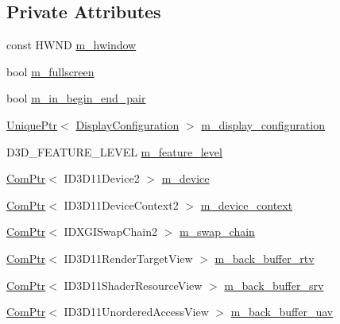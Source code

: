 \subsection*{Private Attributes}
\begin{DoxyCompactItemize}
\item 
const H\+W\+ND \hyperlink{classmage_1_1_renderer_adadc1028e5ad6551abbecfd8529e4aa1}{m\+\_\+hwindow}
\item 
bool \hyperlink{classmage_1_1_renderer_a72bb88b17491bd388460afae9d207b0a}{m\+\_\+fullscreen}
\item 
bool \hyperlink{classmage_1_1_renderer_a3caa1bad6cbfde8f87f807e5c97924e3}{m\+\_\+in\+\_\+begin\+\_\+end\+\_\+pair}
\item 
\hyperlink{namespacemage_a3316d7143a973e37adf1110f2e80ca31}{Unique\+Ptr}$<$ \hyperlink{structmage_1_1_display_configuration}{Display\+Configuration} $>$ \hyperlink{classmage_1_1_renderer_ab5638066fba5a0b9ce307f7db3ba5433}{m\+\_\+display\+\_\+configuration}
\item 
D3\+D\+\_\+\+F\+E\+A\+T\+U\+R\+E\+\_\+\+L\+E\+V\+EL \hyperlink{classmage_1_1_renderer_aa97b108ef58f7d41ddb527f6ba2bfdf9}{m\+\_\+feature\+\_\+level}
\item 
\hyperlink{namespacemage_ae74f374780900893caa5555d1031fd79}{Com\+Ptr}$<$ I\+D3\+D11\+Device2 $>$ \hyperlink{classmage_1_1_renderer_aecf4bcb70dc186b4f2083df38d1e4bc3}{m\+\_\+device}
\item 
\hyperlink{namespacemage_ae74f374780900893caa5555d1031fd79}{Com\+Ptr}$<$ I\+D3\+D11\+Device\+Context2 $>$ \hyperlink{classmage_1_1_renderer_a47c4a1d46e84bbdc3ec876809633877e}{m\+\_\+device\+\_\+context}
\item 
\hyperlink{namespacemage_ae74f374780900893caa5555d1031fd79}{Com\+Ptr}$<$ I\+D\+X\+G\+I\+Swap\+Chain2 $>$ \hyperlink{classmage_1_1_renderer_a5419a7a11e8f0f69e92dd6a5cb9bd217}{m\+\_\+swap\+\_\+chain}
\item 
\hyperlink{namespacemage_ae74f374780900893caa5555d1031fd79}{Com\+Ptr}$<$ I\+D3\+D11\+Render\+Target\+View $>$ \hyperlink{classmage_1_1_renderer_a8569a868dc96be6d831dcbe1d775f4d1}{m\+\_\+back\+\_\+buffer\+\_\+rtv}
\item 
\hyperlink{namespacemage_ae74f374780900893caa5555d1031fd79}{Com\+Ptr}$<$ I\+D3\+D11\+Shader\+Resource\+View $>$ \hyperlink{classmage_1_1_renderer_adddf1283111a3c43a7957411688136b8}{m\+\_\+back\+\_\+buffer\+\_\+srv}
\item 
\hyperlink{namespacemage_ae74f374780900893caa5555d1031fd79}{Com\+Ptr}$<$ I\+D3\+D11\+Unordered\+Access\+View $>$ \hyperlink{classmage_1_1_renderer_a1f62a5eb350d14f7c66022dd45f553e0}{m\+\_\+back\+\_\+buffer\+\_\+uav}

\end{DoxyCompactItemize}
